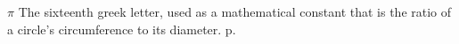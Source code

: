 \begin{eqlist}

\item[$\pi$]
The sixteenth greek letter, used as a mathematical constant that is the ratio of a circle's circumference to its diameter. p.~\pageref{sympi}

\end{eqlist}